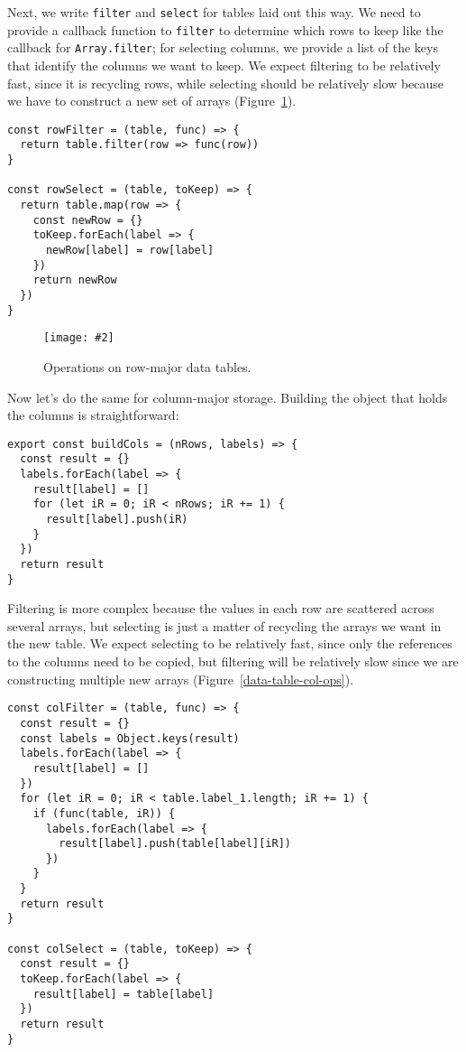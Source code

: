 \documentclass[krantzl]{krantz}
\newcommand{\figpdf}[4]{\begin{figure}%
\centering%
\texttt{[image: \#2]}%
\caption{#3}%
\label{#1}%
\end{figure}}
\newcommand{\figref}[1]{Figure~\ref{#1}}
\begin{document}
Next,
we write \texttt{filter} and \texttt{select} for tables laid out this way.
We need to provide a callback function to \texttt{filter} to determine which rows to keep
like the callback for \texttt{Array.filter};
for selecting columns,
we provide a list of the keys that identify the columns we want to keep.
We expect filtering to be relatively fast,
since it is recycling rows,
while selecting should be relatively slow because we have to construct a new set of arrays
(\figref{data-table-row-ops}).


\begin{lstlisting}[frame=single,frameround=tttt]
const rowFilter = (table, func) => {
  return table.filter(row => func(row))
}

const rowSelect = (table, toKeep) => {
  return table.map(row => {
    const newRow = {}
    toKeep.forEach(label => {
      newRow[label] = row[label]
    })
    return newRow
  })
}
\end{lstlisting}


\figpdf{data-table-row-ops}{./data-table/row-ops.pdf}{Operations on row-major data tables.}{0.6}


Now let's do the same for column-major storage.
Building the object that holds the columns is straightforward:


\begin{lstlisting}[frame=single,frameround=tttt]
export const buildCols = (nRows, labels) => {
  const result = {}
  labels.forEach(label => {
    result[label] = []
    for (let iR = 0; iR < nRows; iR += 1) {
      result[label].push(iR)
    }
  })
  return result
}
\end{lstlisting}



Filtering is more complex because the values in each row are scattered across several arrays,
but selecting is just a matter of recycling the arrays we want in the new table.
We expect selecting to be relatively fast,
since only the references to the columns need to be copied,
but filtering will be relatively slow since we are constructing multiple new arrays
(\figref{data-table-col-ops}).


\begin{lstlisting}[frame=single,frameround=tttt]
const colFilter = (table, func) => {
  const result = {}
  const labels = Object.keys(result)
  labels.forEach(label => {
    result[label] = []
  })
  for (let iR = 0; iR < table.label_1.length; iR += 1) {
    if (func(table, iR)) {
      labels.forEach(label => {
        result[label].push(table[label][iR])
      })
    }
  }
  return result
}

const colSelect = (table, toKeep) => {
  const result = {}
  toKeep.forEach(label => {
    result[label] = table[label]
  })
  return result
}
\end{lstlisting}
\end{document}
